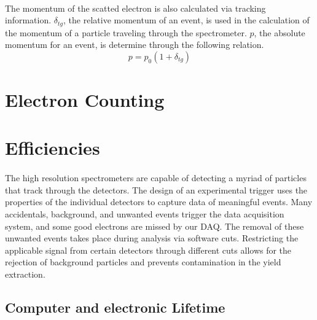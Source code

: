 \paragraph{}The momentum of the scatted electron is also calculated via tracking information.  $\delta_{tg}$, the relative momentum of an event, is used in the calculation of the momentum of a particle traveling through the spectrometer. $p$, the absolute momentum for an event, is determine through the following relation.
\begin{equation}
p = p_0(1+\delta_{tg})
\end{equation}
 
\section{Electron Counting}
\paragraph{}


\section{Efficiencies}
\paragraph{}The high resolution spectrometers are capable of detecting a myriad of particles that track through the detectors. The design of an experimental trigger uses the properties of the individual detectors to capture data of meaningful events. Many accidentals, background, and unwanted events trigger the data acquisition system, and some good electrons are missed by our DAQ. The removal of these unwanted events takes place during analysis via software cuts. Restricting the applicable signal from certain detectors through different cuts allows for the rejection of background particles and prevents contamination in the yield extraction. 

\subsection{Computer and electronic Lifetime}
